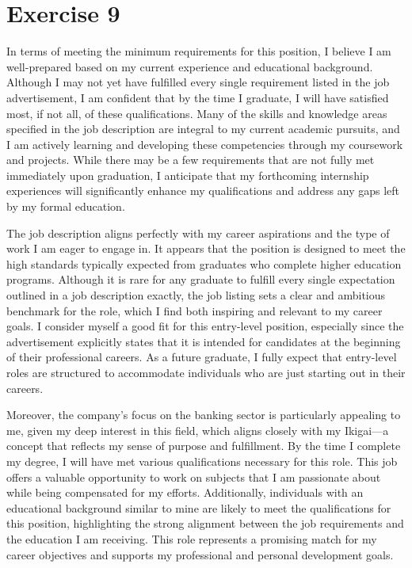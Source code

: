 \documentclass[12pt,titlepage]{article}
\begin{document}
\section*{Exercise 9}
In terms of meeting the minimum requirements for this position, I believe I am well-prepared based on my current experience and educational background. Although I may not yet have fulfilled every single requirement listed in the job advertisement, I am confident that by the time I graduate, I will have satisfied most, if not all, of these qualifications. Many of the skills and knowledge areas specified in the job description are integral to my current academic pursuits, and I am actively learning and developing these competencies through my coursework and projects. While there may be a few requirements that are not fully met immediately upon graduation, I anticipate that my forthcoming internship experiences will significantly enhance my qualifications and address any gaps left by my formal education.

The job description aligns perfectly with my career aspirations and the type of work I am eager to engage in. It appears that the position is designed to meet the high standards typically expected from graduates who complete higher education programs. Although it is rare for any graduate to fulfill every single expectation outlined in a job description exactly, the job listing sets a clear and ambitious benchmark for the role, which I find both inspiring and relevant to my career goals. I consider myself a good fit for this entry-level position, especially since the advertisement explicitly states that it is intended for candidates at the beginning of their professional careers. As a future graduate, I fully expect that entry-level roles are structured to accommodate individuals who are just starting out in their careers.

Moreover, the company’s focus on the banking sector is particularly appealing to me, given my deep interest in this field, which aligns closely with my Ikigai—a concept that reflects my sense of purpose and fulfillment. By the time I complete my degree, I will have met various qualifications necessary for this role. This job offers a valuable opportunity to work on subjects that I am passionate about while being compensated for my efforts. Additionally, individuals with an educational background similar to mine are likely to meet the qualifications for this position, highlighting the strong alignment between the job requirements and the education I am receiving. This role represents a promising match for my career objectives and supports my professional and personal development goals.
\end{document}
